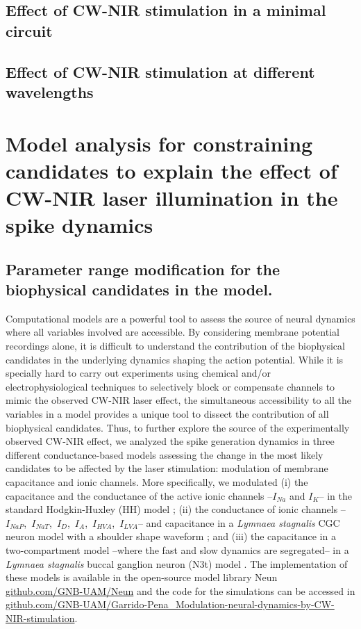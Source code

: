 \subsection{Effect of CW-NIR stimulation in a minimal circuit}


\subsection{Effect of CW-NIR stimulation at different wavelengths}
\section{Model analysis for constraining candidates to explain the effect of CW-NIR laser illumination in the spike dynamics}
\label{sect:models}

\subsection{Parameter range modification for the biophysical candidates in the model. }
Computational models are a powerful tool to assess the source of neural dynamics where all variables involved are accessible. By considering membrane potential recordings alone, it is difficult to understand the contribution of the biophysical candidates in the underlying dynamics shaping the action potential. While it is specially hard to carry out experiments using chemical and/or electrophysiological techniques to selectively block or compensate channels to mimic the observed CW-NIR laser effect, the simultaneous accessibility to all the variables in a model provides a unique tool to dissect the contribution of all biophysical candidates. Thus, to further explore the source of the experimentally observed CW-NIR effect, we analyzed the spike generation dynamics in three different conductance-based models assessing the change in the most likely candidates to be affected by the laser stimulation: modulation of membrane capacitance and ionic channels. More specifically, we modulated (i) the capacitance and the conductance of the active ionic channels --$I_{Na}$ and $I_{K}$-- in the standard Hodgkin-Huxley (HH) model \parencite{HODGKIN1952}; (ii) the conductance of ionic channels --$I_{NaP}$,~$I_{NaT}$,~$I_{D}$,~$I_{A}$,~$I_{HVA}$,~$I_{LVA}$-- and capacitance in a \textit{Lymnaea stagnalis} CGC neuron model with a shoulder shape waveform \parencite{vavoulis_balanced_2010}; and (iii) the capacitance in a two-compartment model --where the fast and slow dynamics are segregated-- in a \textit{Lymnaea stagnalis} buccal ganglion neuron (N3t) model \parencite{Vavoulis2007}. The implementation of these models is available in the open-source model library Neun \href{https://github.com/GNB-UAM/neun}{github.com/GNB-UAM/Neun} and the code for the simulations can be accessed in \href{https://github.com/GNB-UAM/Garrido-Pena_Modulation-neural-dynamics-by-CW-NIR-stimulation}{github.com/GNB-UAM/Garrido-Pena\_Modulation-neural-dynamics-by-CW-NIR-stimulation}.

